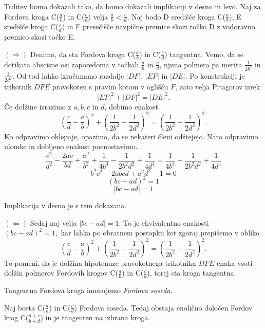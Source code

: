 \documentclass[mat1]{fmfdelo}
\begin{document}
\begin{dokaz}
%
Trditev bomo dokazali tako, da bomo dokazali implikaciji v desno in levo.
Naj za Fordova kroga C($\frac{a}{b}$) in C($\frac{c}{d}$) velja $\frac{a}{b} < \frac{c}{d}$.
Naj bodo D središče kroga C($\frac{a}{b}$), E središče kroga C($\frac{c}{d}$) in F presečišče navpične premice skozi točko D z vodoravno premico skozi točko E.

\( (\Rightarrow) \)
Denimo, da sta Fordova kroga C($\frac{a}{b}$) in C($\frac{c}{d}$) tangentna. Vemo, da se dotikata abscisne osi zaporedoma v točkah $\frac{a}{b}$ in $\frac{c}{d}$, njuna polmera pa merita $\frac{1}{2b^2}$ in $\frac{1}{2d^2}$. Od tod lahko izračunamo razdalje $|DF|$, $|EF|$ in $|DE|$. Po konstrukciji je trikotnik $DFE$ pravokoten s pravim kotom v oglišču $F$, zato velja Pitagorov izrek
\[ |EF|^2 + |DF|^2 = |DE|^2. \]
Če dolžine izrazimo z $a, b, c$ in $d$, dobimo enakost
\[ \left (\frac{c}{d} - \frac{a}{b} \right )^2 + \left (\frac{1}{2b^2} - \frac{1}{2d^2} \right )^2 = \left (\frac{1}{2b^2} + \frac{1}{2d^2} \right )^2. \]
Ko odpravimo oklepaje, opazimo, da se nekateri členi odštejejo. Nato odpravimo ulomke in dobljeno enakost poenostavimo.
\[  \frac{c^2}{d^2} - \frac{2ac}{bd} + \frac{a^2}{b^2} + \frac{1}{4b^4} - \frac{1}{2b^{2}d^{2}} + \frac{1}{4d^4} = \frac{1}{4b^4} + \frac{1}{2b^{2}d^{2}} + \frac{1}{4d^4} \]
\[ b^{2}c^{2} - 2abcd + a^{2}d^{2} - 1 = 0 \]
\[  (bc-ad)^2 = 1 \]
\[ |bc-ad|=1 \]

Implikacija v desno je s tem dokazana.

\( (\Leftarrow) \)
Sedaj naj velja $|bc-ad|=1$. To je ekvivalentno enakosti $ (bc-ad)^2 = 1, $ kar lahko po obratnem postopku kot zgoraj prepišemo v obliko 
\[ \left (\frac{c}{d} - \frac{a}{b} \right )^2 + \left (\frac{1}{2b^2} - \frac{1}{2d^2} \right )^2 = \left (\frac{1}{2b^2} + \frac{1}{2d^2} \right )^2. \]
To pomeni, da je dolžina hipotenuze pravokotnega trikotnika $DFE$ enaka vsoti dolžin polmerov Fordovih krogov C($\frac{a}{b}$) in C($\frac{c}{d}$), torej sta kroga tangentna.
%
\end{dokaz}

\begin{definicija}
Tangentna Fordova kroga imenujemo \emph{Fordova soseda}.
\end{definicija}

\begin{trditev}
Naj bosta C($\frac{a}{b}$) in C($\frac{c}{d}$) Fordova soseda. Tedaj obstaja enolično določen Fordov krog C($\frac{a+c}{b+d}$) in je tangenten na izbrana kroga.
\end{trditev}
\end{document}
